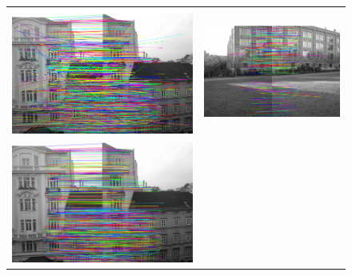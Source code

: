 \setlength {}
\begin{figure}[h]
	\centering
	\begin{tabular}{cc}
	\includegraphics[width=\mywidth]{figures/vl_ubcmatch1.png} &
	\includegraphics[width=\mywidth]{figures/vl_ubcmatch2.png} \\
	\includegraphics[width=\mywidth]{figures/ransac1.png} &

\end{tabular}
\end{figure}
